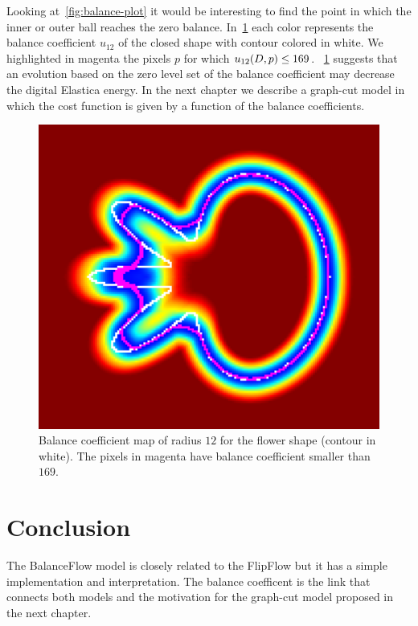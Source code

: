 Looking at~\cref{fig:balance-plot} it would be interesting to find the point in which the inner or outer ball reaches the zero balance. In~\cref{fig:flower-balance-coefficient-zero-set} each color represents the balance coefficient $u_{12}$ of the closed shape with contour colored in white. We highlighted in magenta the pixels $p$ for which $u_{12}(D,p) \leq 169$. ~\cref{fig:flower-balance-coefficient-zero-set} suggests that an evolution based on the zero level set of the balance coefficient may decrease the digital Elastica energy. In the next chapter we describe a graph-cut model in which the cost function is given by a function of the balance coefficients.

\begin{figure}
\center
\includegraphics[scale=0.05]{figures/chapter7/level-set/flower.pdf}
\caption{Balance coefficient map of radius $12$ for the flower shape (contour in white). The pixels in magenta have balance coefficient smaller than $169$. }
\label{fig:flower-balance-coefficient-zero-set}
\end{figure}


\section{Conclusion}
The BalanceFlow model is closely related to the FlipFlow but it has a simple implementation and interpretation. The balance coefficent is the link that connects both models and the motivation for the graph-cut model proposed in the next chapter.




